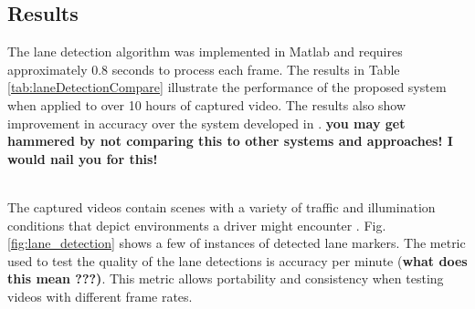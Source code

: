 \documentclass{article}
\begin{document}
\subsection{Results}
The lane detection algorithm was implemented in Matlab and requires 
approximately 0.8 seconds to process each frame. 
The results in Table \ref{tab:laneDetectionCompare} illustrate the performance of the proposed system when applied to over 10 hours of captured video. The results also show improvement in accuracy over the system developed in \cite{borkar_layered_2009}. {\bf you may get hammered by not comparing this to other systems and approaches!  I would nail you for this!}
\begin{table}[htb!]
\caption{Comparing accuracies of lane detection system}
\label{tab:laneDetectionCompare}
\end{table}\\
The captured videos contain scenes with a variety of traffic and illumination conditions that depict environments a driver might encounter \cite{borkar_layered_2009}. Fig. \ref{fig:lane_detection} shows a few of instances of detected lane markers.
The metric used to test the quality of the lane detections is accuracy per minute {(\bf what does this mean ???)}. This metric allows portability and consistency when testing videos with different frame rates.
\end{document}
